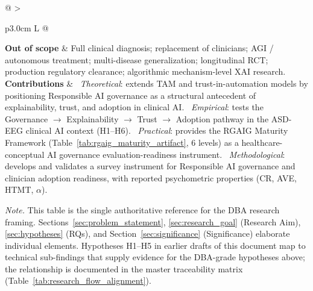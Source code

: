 {\begin{xltabular}{\textwidth}{@{} >{\raggedright\arraybackslash}p{3.0cm} L @{}}
\textbf{Out of scope} & Full clinical diagnosis; replacement of clinicians; AGI / autonomous treatment; multi-disease generalization; longitudinal RCT; production regulatory clearance; algorithmic mechanism-level XAI research. \\
\midrule
\textbf{Contributions} & \textbullet\ \emph{Theoretical}: extends TAM and trust-in-automation models by positioning Responsible AI governance as a structural antecedent of explainability, trust, and adoption in clinical AI. \quad \textbullet\ \emph{Empirical}: tests the Governance $\to$ Explainability $\to$ Trust $\to$ Adoption pathway in the ASD-EEG clinical AI context (H1--H6). \quad \textbullet\ \emph{Practical}: provides the RGAIG Maturity Framework (Table~\ref{tab:rgaig_maturity_artifact}, 6 levels) as a healthcare-conceptual AI governance evaluation-readiness instrument. \quad \textbullet\ \emph{Methodological}: develops and validates a survey instrument for Responsible AI governance and clinician adoption readiness, with reported psychometric properties (CR, AVE, HTMT, $\alpha$). \\
\end{xltabular}}
\vspace{0.5em}
\noindent\textit{Note.} This table is the single authoritative reference for the DBA research framing. Sections~\ref{sec:problem_statement}, \ref{sec:research_goal} (Research Aim), \ref{sec:hypotheses} (RQs), and Section~\ref{sec:significance} (Significance) elaborate individual elements. Hypotheses H1--H5 in earlier drafts of this document map to technical sub-findings that supply evidence for the DBA-grade hypotheses above; the relationship is documented in the master traceability matrix (Table~\ref{tab:research_flow_alignment}).

